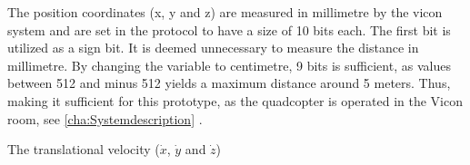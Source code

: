 The position coordinates (x, y and z) are measured in millimetre by the vicon system and are set in the protocol to have a size of 10 bits each. The first bit is utilized as a sign bit. It is deemed unnecessary to measure the distance in millimetre. By changing the variable to centimetre, 9 bits is sufficient, as values between 512 and minus 512 yields a maximum distance around 5 meters. Thus, making it sufficient for this prototype, as the quadcopter is operated in the Vicon room, see \autoref{cha:Systemdescription} .

The translational velocity ($\dot{x}$, $\dot{y}$ and $\dot{z}$) 






